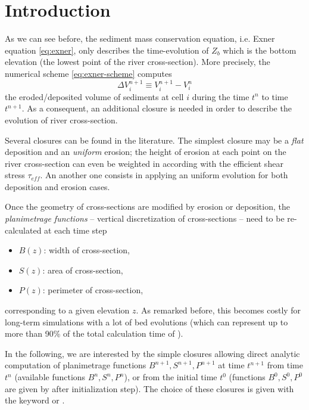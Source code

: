 \section{Introduction}

As we can see before, the sediment mass conservation equation, i.e. Exner equation \eqref{eq:exner}, only describes the time-evolution of $Z_b$ which is the bottom elevation (the lowest point of the river cross-section). More precisely, the numerical scheme \eqref{eq:exner-scheme} computes
\begin{equation}\label{eq:exner-sediment-volume}
\Delta V_i^{n+1} \equiv V_i^{n+1} - V_i^n
\end{equation}
the eroded/deposited volume of sediments at cell $i$ during the time $t^n$ to time $t^{n+1}$. As a consequent, an additional closure is needed in order to describe the evolution of river cross-section.

Several closures can be found in the literature. The simplest closure may be a {\em flat} deposition and an {\em uniform} erosion; the height of erosion at each point on the river cross-section can even be weighted in according with the efficient shear stress $\tau_{eff}$. An another one consists in applying an uniform evolution for both deposition and erosion cases.

Once the geometry of cross-sections are modified by erosion or deposition, the {\em planimetrage functions} -- vertical discretization of cross-sections -- need to be re-calculated at each time step
\begin{itemize}
\item $B(z)$: width of cross-section,
\item $S(z)$: area of cross-section,
\item $P(z)$: perimeter of cross-section,
\end{itemize}
corresponding to a given elevation $z$. As remarked before, this becomes costly for long-term simulations with a lot of bed evolutions (which can represent up to more than 90\% of the total calculation time of \courlis).

In the following, we are interested by the simple closures allowing direct analytic computation of planimetrage functions $B^{n+1}, S^{n+1}, P^{n+1}$ at time $t^{n+1}$ from time $t^n$ (available  functions $B^n, S^n, P^n$), or from the initial time $t^0$ (functions $B^0, S^0, P^0$ are given by \mascaret after initialization step).  The choice of these closures is given with the keyword  or .

